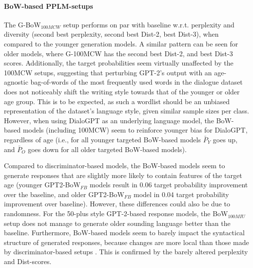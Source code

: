 \paragraph{BoW-based PPLM-setups} The G-BoW$_{100MCW}$ setup performs on par with baseline w.r.t. perplexity and diversity (second best perplexity, second best Dist-2, best Dist-3), when compared to the younger generation models. A similar pattern can be seen for older models, where G-100MCW has the second best Dist-2, and best Dist-3 scores. Additionally, the target probabilities seem virtually unaffected by the 100MCW setups, suggesting that perturbing GPT-2's output with an age-agnostic bag-of-words of the most frequently used words in the dialogue dataset does not noticeably shift the writing style towards that of the younger or older age group. This is to be expected, as such a wordlist should be an unbiased representation of the dataset's language style, given similar sample sizes per class.
However, when using DialoGPT as an underlying language model, the BoW-based models (including 100MCW) seem to reinforce younger bias for DialoGPT, regardless of age (i.e., for all younger targeted BoW-based models $\bar{P}_Y$ goes up, and $\bar{P}_O$ goes down for all older targeted BoW-based models).

Compared to discriminator-based models, the BoW-based models seem to generate responses that are slightly more likely to contain features of the target age (younger GPT2-BoW$_{FB}$ models result in 0.06 target probability improvement over the baseline, and older GPT2-BoW$_{FB}$ model in 0.04 target probability improvement over baseline). However, these differences could also be due to randomness. For the 50-plus style GPT-2-based response models, the BoW$_{100MIU}$ setup does not manage to generate older sounding language better than the baseline. Furthermore, BoW-based models seem to barely impact the syntactical structure of generated responses, because changes are more local than those made by discriminator-based setups \cite{dathathri2019plug}. This is confirmed by the barely altered perplexity and Dist-scores. 

